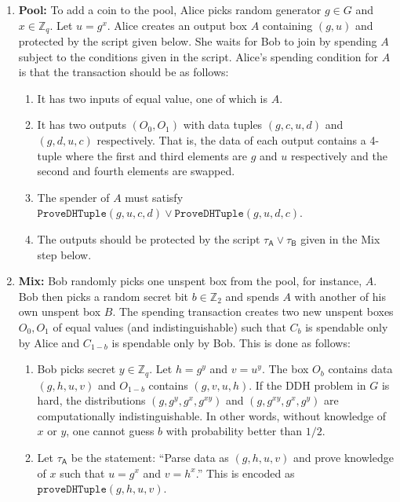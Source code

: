 \documentclass[11pt]{article}
\begin{document}
\begin{enumerate}
	\item \textbf{Pool:} To add a coin to the pool, Alice picks random generator $g\in G$ and $x\in \mathbb{Z}_q$. Let $u = g^{x}$. Alice creates an output box $A$ containing $(g, u)$ and protected by the script given below. She waits for Bob to join by spending $A$ subject to the conditions given in the script. 
Alice's spending condition for $A$ is that the transaction should be as follows: 
	
	\begin{enumerate}
		\item It has two inputs of equal value, one of which is $A$. %
		\item It has two outputs $(O_0, O_1)$ with data tuples $(g, c, u, d)$ and $(g, d, u, c)$ respectively. That is, the data of each output contains a 4-tuple where the first and third elements are $g$ and $u$ respectively and the second and fourth elements are swapped. 
		\item The spender of $A$ must satisfy $\texttt{ProveDHTuple}(g, u, c, d)\lor \texttt{ProveDHTuple}(g, u, d, c)$.
		\item The outputs should be protected by the script $\tau_\textsf{A} \lor \tau_\textsf{B}$ given in the Mix step below.
	\end{enumerate}
	
	
	\item \textbf{Mix:} Bob randomly picks one unspent box from the pool, for instance, $A$. Bob then picks a random secret bit $b \in \mathbb{Z}_2$ and spends $A$ with another of his own unspent box $B$. The spending transaction creates two new unspent boxes $O_0, O_1$ of equal values (and indistinguishable) such that $C_b$ is spendable only by Alice and $C_{1-b}$ is spendable only by Bob. This is done as follows:
	
	\begin{enumerate}
		\item Bob picks secret $y\in \mathbb{Z}_q$. Let $h = {g}^{y}$ and $v = {u}^{y}$.  %
		The box $O_b$ contains data $(g, h, u, v)$ and $O_{1-b}$ contains $(g, v, u, h)$. If the DDH problem in $G$ is hard, the distributions $(g, {g}^{y}, {g}^{x}, {g}^{xy})$ and 
		$(g, {g}^{xy}, {g}^{x}, {g}^{y})$ are computationally indistinguishable. In other words, without knowledge of $x$ or $y$, one cannot guess $b$ with probability better than $1/2$.
		\item  Let 
		$\tau_\textsf{A}$ be the statement: ``Parse data as $(g, h, u, v)$ and
		prove knowledge of $x$ such that $u = {g}^{x}$ and ${v} = {h}^{x}$.'' This is encoded as $\texttt{proveDHTuple}(g, h, u, v)$.
		

\end{enumerate}
\end{enumerate}
\end{document}
